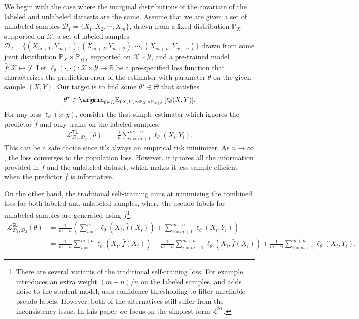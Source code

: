 We begin with the case where the marginal distributions of the covariate of the labeled and unlabeled datasets are the same. 
Assume that we are given a set of unlabeled samples $\mathcal{D}_1 = \{X_1,X_2,\cdots, X_m\}$, drawn from a fixed distribution $\mathbb{P}_X$ supported on $\mathcal{X}$, a set of labeled samples $\mathcal{D}_2 =\{(X_{m+1}, Y_{m+1}), (X_{m+2}, Y_{m+2}), \cdots, (X_{m+n}, Y_{m+n})\}$ drawn from some joint distribution $\mathbb{P}_X\times \mathbb{P}_{Y|X}$ supported on $\mathcal{X}\times\mathcal{Y}$, and a pre-trained model  $\hat f:\mathcal{X}\mapsto \mathcal{Y}$. Let $\ell_\theta(\cdot, \cdot):\mathcal{X}\times\mathcal{Y}\mapsto \mathbb{R}$ be a pre-specified loss function that characterizes the prediction error of the estimator with parameter $\theta$ on the given sample $(X, Y)$. 
Our target is to find some $\theta^\star\in\Theta$ that satisfies
\begin{align*}
    \theta^\star \in \argmin_{\theta\in\Theta} \mathbb{E}_{(X, Y)\sim \mathbb{P}_{X}\times \mathbb{P}_{Y|X}}[\ell_\theta(X,Y)].
\end{align*}
For any loss $\ell_\theta(x, y)$, consider the first simple estimator which ignores the predictor $\hat f$ and only trains on the labeled samples:
\begin{align*}
\mathcal{L}^{\mathsf{TL}}_{\mathcal{D}_1,\mathcal{D}_2}(\theta) 
& = \frac{1}{n}    \sum_{i=m+1}^{m+n} \ell_\theta(X_i, Y_i).  
\end{align*}
This can be a safe choice since it's always an empirical risk minimizer. As $n\rightarrow \infty$, the loss converges to the population loss. However, it ignores all the information provided in $\hat f$ and the unlabeled dataset, which makes it less sample efficient when the predictor $\hat f$ is informative.

On the other hand, the traditional self-training aims at minimizing the combined loss for both labeled and unlabeled samples, where the pseudo-labels for unlabeled samples are generated using $\hat f$\footnote{There are several variants of the traditional self-training loss. For example, \citet{xie2020self} introduces an extra weight $(m+n)/n$ on the labeled samples, and adds noise to the student model; \citet{sohn2020fixmatch} uses confidence thresholding to filter unreliable pseudo-labels. However, both of the alternatives still suffer from the inconsistency issue. In this paper we focus on the simplest form $\mathcal{L}^{\mathsf{SL}}$.  }:
\begin{align*}
\mathcal{L}^{\mathsf{SL}}_{\mathcal{D}_1,\mathcal{D}_2}(\theta) 
& = \frac{1}{m+n}  \left(\sum_{i=1}^m \ell_\theta(X_i, \hat f(X_i)) + \sum_{i=m+1}^{m+n} \ell_\theta(X_i, Y_i)\right) \\
& = \frac{1}{m+n}  \sum_{i=1}^{m+n} \ell_\theta(X_i, \hat f(X_i)) -  \frac{1}{m+n} \sum_{i=m+1}^{m+n} \ell_\theta(X_i, \hat f(X_i))  + \frac{1}{m+n} \sum_{i=m+1}^{m+n} \ell_\theta(X_i, Y_i). 
\end{align*}

